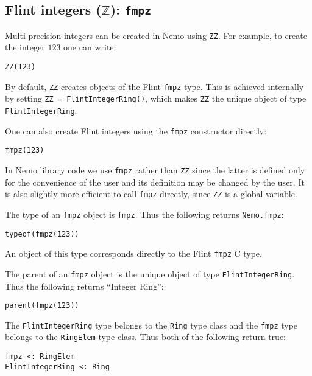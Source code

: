 \documentclass[a4paper,10pt]{article}
\newcommand{\Z}{\mathbb{Z}}
\newcommand{\code}{\lstinline}
\begin{document}
\subsection{Flint integers ($\Z$): \code{fmpz}}

Multi-precision integers can be created in Nemo using \code{ZZ}. For example, to create the integer
$123$ one can write:

\begin{lstlisting}
ZZ(123)
\end{lstlisting}

By default, \code{ZZ} creates objects of the Flint \code{fmpz} type. This is achieved internally by
setting \code{ZZ = FlintIntegerRing()}, which makes \code{ZZ} the unique object of type
\code{FlintIntegerRing}.

One can also create Flint integers using the \code{fmpz} constructor directly:

\begin{lstlisting}
fmpz(123)
\end{lstlisting}

In Nemo library code we use \code{fmpz} rather than \code{ZZ} since the latter is defined only for the
convenience of the user and its definition may be changed by the user. It is also slightly more
efficient to call \code{fmpz} directly, since \code{ZZ} is a global variable.

The type of an \code{fmpz} object is \code{fmpz}. Thus the following returns \code{Nemo.fmpz}:

\begin{lstlisting}
typeof(fmpz(123))
\end{lstlisting}

An object of this type corresponds directly to the Flint \code{fmpz} C type.

The parent of an \code{fmpz} object is the unique object of type \code{FlintIntegerRing}. Thus the
following returns ``Integer Ring'':

\begin{lstlisting}
parent(fmpz(123))
\end{lstlisting}

The \code{FlintIntegerRing} type belongs to the \code{Ring} type class and the \code{fmpz} type
belongs to the \code{RingElem} type class. Thus both of the following return true:

\begin{lstlisting}
fmpz <: RingElem
FlintIntegerRing <: Ring
\end{lstlisting}
\end{document}
